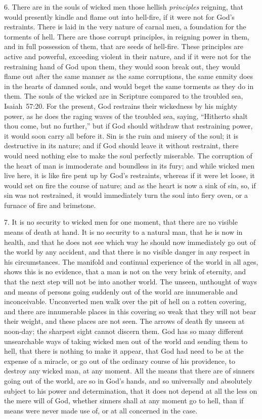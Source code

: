 \documentclass[
]{book}
\begin{document}
6. There are in the souls of wicked men those hellish \emph{principles} reigning, that would presently kindle and flame out into hell-fire, if it were not for God's restraints. There is laid in the very nature of carnal men, a foundation for the torments of hell. There are those corrupt principles, in reigning power in them, and in full possession of them, that are seeds of hell-fire. These principles are active and powerful, exceeding violent in their nature, and if it were not for the restraining hand of God upon them, they would soon break out, they would flame out after the same manner as the same corruptions, the same enmity does in the hearts of damned souls, and would beget the same torments as they do in them. The souls of the wicked are in Scripture compared to the troubled sea, Isaiah~57:20. For the present, God restrains their wickedness by his mighty power, as he does the raging waves of the troubled sea, saying, ``Hitherto shalt thou come, but no further,'' but if God should withdraw that restraining power, it would soon carry all before it. Sin is the ruin and misery of the soul; it is destructive in its nature; and if God should leave it without restraint, there would need nothing else to make the soul perfectly miserable. The corruption of the heart of man is immoderate and boundless in its fury; and while wicked men live here, it is like fire pent up by God's restraints, whereas if it were let loose, it would set on fire the course of nature; and as the heart is now a sink of sin, so, if sin was not restrained, it would immediately turn the soul into fiery oven, or a furnace of fire and brimstone.

7. It is no security to wicked men for one moment, that there are no visible means of death at hand. It is no security to a natural man, that he is now in health, and that he does not see which way he should now immediately go out of the world by any accident, and that there is no visible danger in any respect in his circumstances. The manifold and continual experience of the world in all ages, shows this is no evidence, that a man is not on the very brink of eternity, and that the next step will not be into another world. The unseen, unthought of ways and means of persons going suddenly out of the world are innumerable and inconceivable. Unconverted men walk over the pit of hell on a rotten covering, and there are innumerable places in this covering so weak that they will not bear their weight, and these places are not seen. The arrows of death fly unseen at noon-day; the sharpest sight cannot discern them. God has so many different unsearchable ways of taking wicked men out of the world and sending them to hell, that there is nothing to make it appear, that God had need to be at the expense of a miracle, or go out of the ordinary course of his providence, to destroy any wicked man, at any moment. All the means that there are of sinners going out of the world, are so in God's hands, and so universally and absolutely subject to his power and determination, that it does not depend at all the less on the mere will of God, whether sinners shall at any moment go to hell, than if means were never made use of, or at all concerned in the case.
\end{document}
